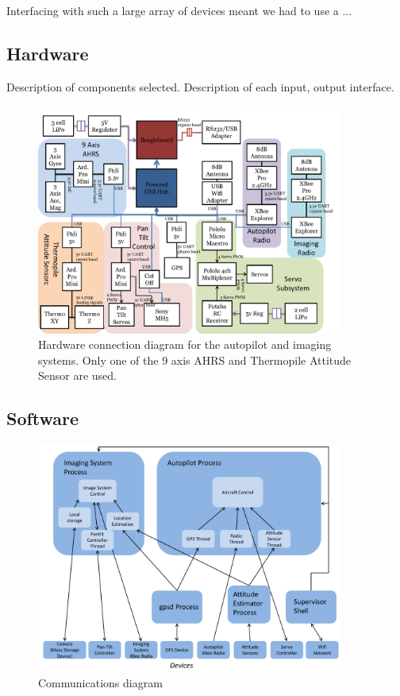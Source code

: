 \documentclass[10pt]{report}
\begin{document}
Interfacing with such a large array of devices meant we had to use a ...

\subsection{Hardware}
Description of components selected.
Description of each input, output interface.
\begin{figure}
	\centering
	\includegraphics[width=0.9\textwidth]{../images/hardware_conn_diagram.pdf}
	\caption{Hardware connection diagram for the autopilot and imaging systems. Only one of the 9 axis AHRS and Thermopile Attitude Sensor are used.}
	\label{fig:hardware_conn_diagram}
\end{figure}

\subsection{Software}
\label{sec:autopilot_software}

\begin{figure}
	\centering
	\includegraphics[width=0.9\textwidth]{../images/software_comm_diagram.pdf}
	\caption{Communications diagram}	
	\label{fig:software_comm_diagram}
\end{figure}
\end{document}

